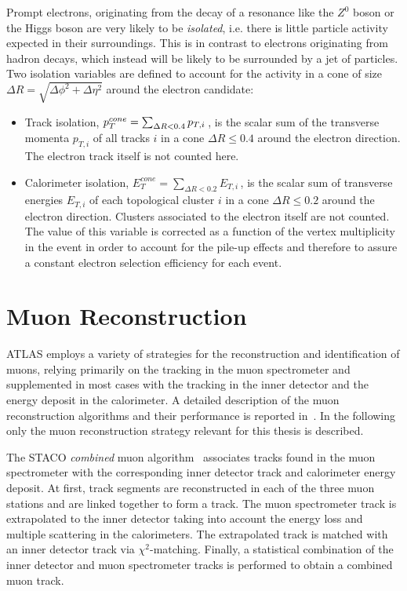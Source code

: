 Prompt electrons, originating from the decay of a resonance like the $Z^0$ boson or the Higgs boson are very
likely to be \emph{isolated}, i.e. there is little particle activity expected in their surroundings. This is in contrast
to electrons originating from  hadron decays, which instead will be likely to be surrounded by a jet of particles.
Two isolation variables are defined to account for the activity in a cone of size $\Delta R = \sqrt{\Delta\phi^2 + \Delta\eta^2}$ 
around the electron candidate:
\begin{itemize}
	\item Track isolation, $ p_{T}^{cone}  =  \sum_{\Delta R < 0.4}  p_{T,i} \,$,  is the scalar sum of the transverse momenta $ p_{T,i}$ of all tracks $i$ in a cone 
	$\Delta R \leq 0.4$ around the electron direction. The electron track itself is not counted here.
	
	\item Calorimeter isolation, $E_T^{cone} = \sum_{\Delta R < 0.2}  E_{T,i} \,$, is the scalar sum of  
	 transverse energies $ E_{T,i}$ of each topological cluster $i$ 
	 in a  cone  $\Delta R \leq 0.2$  around the electron direction. Clusters associated to the electron itself are not counted.
	 The value of this variable is corrected as a function of the vertex multiplicity in the event 
	in order to account for the pile-up effects and therefore to assure a constant electron  selection efficiency for each event.
\end{itemize}



\section{Muon Reconstruction}\label{sec:muon}
ATLAS employs a variety of strategies for the reconstruction and identification of muons, relying primarily on the
tracking in the muon spectrometer and supplemented in most cases with the tracking in the inner detector and the energy deposit in the calorimeter.
 A detailed description of the muon reconstruction algorithms and their performance is reported in~\cite{AtlasCSCBook}.
In the following only the muon reconstruction strategy relevant for this thesis is described.

The STACO \emph{combined} muon algorithm~\cite{staco} associates tracks found in the
muon spectrometer with the corresponding inner detector track and calorimeter energy deposit.
At first,  track segments are reconstructed in each of the three
muon stations and are linked together to form a track. The muon spectrometer track is
extrapolated to the inner detector taking into account the energy loss and multiple scattering in the calorimeters.
The extrapolated track is  matched with an inner detector track via $\chi^2$-matching. Finally,
a statistical combination of the inner detector and muon spectrometer tracks is performed to obtain a combined muon track. 

